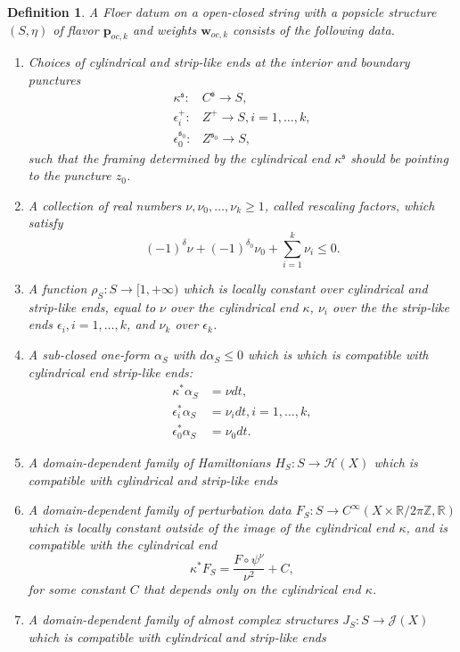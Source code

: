 \documentclass[11pt]{amsproc}
\def\Z{{\mathbb Z}}
\def\R{{\mathbb R}}
\def\e{\epsilon}
\def\e{\epsilon}
\def\k{\kappa}
\def\d{\delta}
\def\sk{\mathfrak{s}}
\newtheorem{defn}[lem]{Definition}
\def\e{\epsilon}
\theoremstyle{remark}
\numberwithin{equation}{section}
\begin{document}
\begin{defn}\label{def: Floer data for open-closed string}
A Floer datum on a open-closed string with a popsicle structure $(S, \eta)$ of flavor $\mathbf{p}_{oc, k}$ and weights $\mathbf{w}_{oc, k}$ consists of the following data.
\begin{enumerate}[label=(\roman*)]

\item Choices of cylindrical and strip-like ends at the interior and boundary punctures
\begin{align}
\k^{\sk}: & C^{\sk} \to S, \\
\e^{+}_{i}: & Z^{+} \to S, i = 1, \ldots, k,\\
\e^{\sk_{0}}_{0}: & Z^{\sk_{0}} \to S,
\end{align}
such that the framing determined by the cylindrical end $\k^{\sk}$ should be pointing to the puncture $z_{0}$.

\item A collection of real numbers $\nu, \nu_{0}, \ldots, \nu_{k} \ge 1$, 
called {\it rescaling factors},
which satisfy
\begin{equation}
(-1)^{\d} \nu + (-1)^{\d_{0}} \nu_{0} + \sum_{i=1}^{k} \nu_{i} \le 0.
\end{equation}

\item A function $\rho_{S}: S \to [1, +\infty)$ which is locally constant over cylindrical and strip-like ends,
equal to $\nu$ over the cylindrical end $\k$, $\nu_{i}$ over the the strip-like ends $\e_{i}, i = 1, \ldots, k$,
and $\nu_{k}$ over $\e_{k}$.

\item A sub-closed one-form $\alpha_{S}$ with $d\alpha_{S} \le 0$ which is which is compatible with cylindrical end strip-like ends:
\begin{align}
\k^{*} \alpha_{S} & = \nu dt, \\
\e_{i}^{*} \alpha_{S} & = \nu_{i}dt, i =1,\ldots, k,\\
\e_{0}^{*} \alpha_{S} & = \nu_{0} dt.
\end{align}

\item A domain-dependent family of Hamiltonians $H_{S}: S \to \mathcal{H}(X)$ which is compatible with cylindrical and strip-like ends

\item A domain-dependent family of perturbation data $F_{S}: S \to C^{\infty}(X \times \R/2\pi\Z, \R)$ which is locally constant outside of the image of the cylindrical end $\k$,
and is compatible with the cylindrical end 
\begin{equation}
\k^{*} F_{S} = \frac{F \circ \psi^{\nu}}{\nu^{2}} + C,
\end{equation}
for some constant $C$ that depends only on the cylindrical end $\k$.

\item A domain-dependent family of almost complex structures $J_{S}: S \to \mathcal{J}(X)$ which is compatible with cylindrical and strip-like ends

\end{enumerate}

\end{defn}
\end{document}
